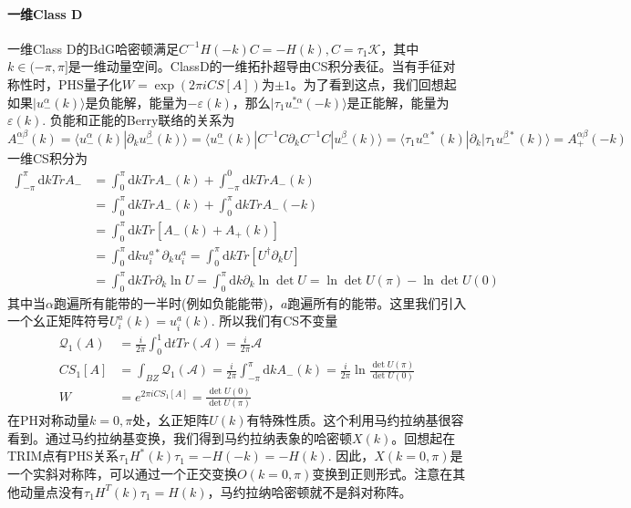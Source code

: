 \documentclass{article}
\numberwithin{equation}{subsection}
\begin{document}
\paragraph{一维Class D}
一维Class D的BdG哈密顿满足$C^{-1}H(-k)C=-H(k),C=\tau_1\mathcal{K}$，其中$k\in(-\pi,\pi]$是一维动量空间。ClassD的一维拓扑超导由CS积分表征。当有手征对称性时，PHS量子化$W=\exp(2\pi iCS[A])$为$\pm 1$。为了看到这点，我们回想起如果$|u_-^\alpha(k)\rangle$是负能解，能量为$-\varepsilon(k)$，那么$|\tau_1u^{*\alpha}_-(-k)\rangle$是正能解，能量为$\varepsilon(k)$. 负能和正能的Berry联络的关系为
\begin{equation}
    A_-^{\alpha\beta}(k)=\langle u_-^\alpha(k)|\partial_k u_-^\beta(k)\rangle=\langle u_-^\alpha(k)|C^{-1}C\partial_k C^{-1}C|u_-^\beta(k)\rangle=\langle \tau_1u_-^{\alpha*}(k)|\partial_k|\tau_1u_-^{\beta*}(k)\rangle=A_+^{\alpha\beta}(-k)
\end{equation}
一维CS积分为
\begin{equation}
    \begin{split}
        \int_{-\pi}^{\pi}\mathrm{d}kTrA_-&=\int_{0}^\pi\mathrm{d}kTrA_-(k)+\int_{-\pi}^0\mathrm{d}kTrA_-(k)\\
        &=\int_0^\pi\mathrm{d}kTrA_-(k)+\int_{0}^\pi\mathrm{d}kTrA_-(-k)\\
        &=\int_0^\pi\mathrm{d}kTr[A_-(k)+A_+(k)]\\
        &=\int_0^\pi\mathrm{d}ku_i^{a*}\partial_k u_i^{a}=\int_0^\pi\mathrm{d}kTr[U^\dagger\partial_kU]\\
        &=\int_0^\pi\mathrm{d}kTr\partial_k\ln U=\int_0^\pi\mathrm{d}k\partial_k\ln\det U=\ln\det U(\pi)-\ln\det U(0)
    \end{split}
\end{equation}
其中当$\alpha$跑遍所有能带的一半时(例如负能能带)，$a$跑遍所有的能带。这里我们引入一个幺正矩阵符号$U_i^a(k)=u_i^a(k)$. 所以我们有CS不变量
\begin{equation}
    \begin{split}
        \mathcal{Q}_1(A)&=\frac{i}{2\pi}\int_0^1\mathrm{d}tTr(\mathcal{A})=\frac{i}{2\pi}\mathcal{A}\\
        CS_1[A]&=\int_{BZ}\mathcal{Q}_1(\mathcal{A})=\frac{i}{2\pi}\int_{-\pi}^{\pi}\mathrm{d}kA_-(k)=\frac{i}{2\pi}\ln\frac{\det U(\pi)}{\det U(0)}\\
        W&=e^{2\pi iCS_1[A]}=\frac{\det U(0)}{\det U(\pi)}
    \end{split}
\end{equation}
在PH对称动量$k=0,\pi$处，幺正矩阵$U(k)$有特殊性质。这个利用马约拉纳基很容看到。通过马约拉纳基变换，我们得到马约拉纳表象的哈密顿$X(k)$。回想起在TRIM点有PHS关系$\tau_1H^*(k)\tau_1=-H(-k)=-H(k)$. 因此，$X(k=0,\pi)$是一个实斜对称阵，可以通过一个正交变换$O(k=0,\pi)$变换到正则形式。注意在其他动量点没有$\tau_1H^T(k)\tau_1=H(k)$，马约拉纳哈密顿就不是斜对称阵。
\end{document}
